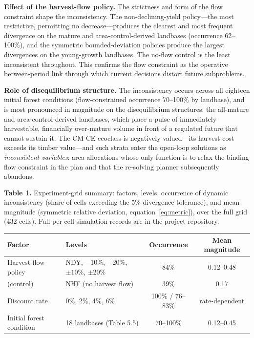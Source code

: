\documentclass[12pt]{article}
\begin{document}
\textbf{Effect of the harvest-flow policy.} The strictness and form of the flow constraint shape the inconsistency. The non-declining-yield policy---the most restrictive, permitting no decrease---produces the clearest and most frequent divergence on the mature and area-control-derived landbases (occurrence 62--100\%), and the symmetric bounded-deviation policies produce the largest divergences on the young-growth landbases. The no-flow control is the least inconsistent throughout. This confirms the flow constraint as the operative between-period link through which current decisions distort future subproblems.

\textbf{Role of disequilibrium structure.} The inconsistency occurs across all eighteen initial forest conditions (flow-constrained occurrence 70--100\% by landbase), and is most pronounced in magnitude on the disequilibrium structures: the all-mature and area-control-derived landbases, which place a pulse of immediately harvestable, financially over-mature volume in front of a regulated future that cannot sustain it. The CM-CE ecoclass is negatively valued---its harvest cost exceeds its timber value---and such strata enter the open-loop solutions as \emph{inconsistent variables}: area allocations whose only function is to relax the binding flow constraint in the plan and that the re-solving planner subsequently abandons.

\textbf{Table 1.} Experiment-grid summary: factors, levels, occurrence of dynamic inconsistency (share of cells exceeding the 5\% divergence tolerance), and mean magnitude (symmetric relative deviation, equation~\eqref{eq:metric}), over the full grid (432 cells). Full per-cell simulation records are in the project repository.

\begin{table}[h]
\centering
\small
\begin{tabular}{@{}llcc@{}}
\toprule
Factor & Levels & Occurrence & Mean magnitude \\
\midrule
Harvest-flow policy & NDY, $-10\%$, $-20\%$, $\pm10\%$, $\pm20\%$ & 84\% & 0.12--0.48 \\
\quad (control) & NHF (no harvest flow) & 39\% & 0.17 \\
Discount rate & 0\%, 2\%, 4\%, 6\% & 100\% / 76--83\% & rate-dependent \\
Initial forest condition & 18 landbases (Table 5.5) & 70--100\% & 0.12--0.45 \\
\bottomrule
\end{tabular}
\end{table}
\end{document}
